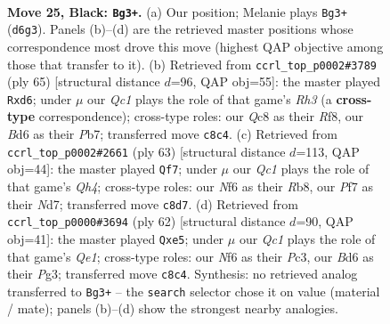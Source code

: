 \documentclass[11pt]{article}
\begin{document}
\clearpage

\begin{figure}[p]\centering
\begin{subfigure}{0.46\textwidth}\centering
\resizebox{\linewidth}{!}{%
\newchessgame
\chessboard[
  setfen={r1qk3r/p4pp1/3b1n1p/5P1P/B1Q4R/8/6p1/R1B1K1N1 b Q - 0 25},
  showmover=false,
  pgfstyle=straightmove, color=movearrow, markmove={d6-g3}
]}
\caption{}
\end{subfigure}\hfill
\begin{subfigure}{0.46\textwidth}\centering
\resizebox{\linewidth}{!}{%
\newchessgame
\chessboard[
  setfen={5r1k/1p6/p1nQ3r/2p2ppq/2P5/1P1P1BB1/P7/1R3RK1 b - - 0 33},
  showmover=false,
  pgfstyle=straightmove, color=movearrow, markmove={h6-d6}
]}
\caption{}
\end{subfigure}
\\[4pt]
\begin{subfigure}{0.46\textwidth}\centering
\resizebox{\linewidth}{!}{%
\newchessgame
\chessboard[
  setfen={1r4k1/3n2p1/1P1p1r2/2pP3q/P4pp1/8/3N1P2/2RR1BKQ b - - 1 32},
  showmover=false,
  pgfstyle=straightmove, color=movearrow, markmove={h5-f7}
]}
\caption{}
\end{subfigure}\hfill
\begin{subfigure}{0.46\textwidth}\centering
\resizebox{\linewidth}{!}{%
\newchessgame
\chessboard[
  setfen={1r4k1/1q6/6p1/ppb1r2p/3N4/P1P3PP/1P3K2/3RQ3 w - - 0 32},
  showmover=false,
  pgfstyle=straightmove, color=movearrow, markmove={e1-e5}
]}
\caption{}
\end{subfigure}
\caption{\textbf{Move 25, Black: \texttt{Bg3+}.} (a) Our position; Melanie plays \texttt{Bg3+} (\texttt{d6g3}). Panels (b)--(d) are the retrieved master positions whose correspondence most drove this move (highest QAP objective among those that transfer to it). (b) Retrieved from \texttt{ccrl\_top\_p0002\#3789} (ply 65) [structural distance $d$=96, QAP obj=55]: the master played \texttt{Rxd6}; under $\mu$ our \emph{Qc1} plays the role of that game's \emph{Rh3} (a \textbf{cross-type} correspondence); cross-type roles: our \emph{Q}c8 as their \emph{R}f8, our \emph{B}d6 as their \emph{P}b7; transferred move \texttt{c8c4}. (c) Retrieved from \texttt{ccrl\_top\_p0002\#2661} (ply 63) [structural distance $d$=113, QAP obj=44]: the master played \texttt{Qf7}; under $\mu$ our \emph{Qc1} plays the role of that game's \emph{Qh4}; cross-type roles: our \emph{N}f6 as their \emph{R}b8, our \emph{P}f7 as their \emph{N}d7; transferred move \texttt{c8d7}. (d) Retrieved from \texttt{ccrl\_top\_p0000\#3694} (ply 62) [structural distance $d$=90, QAP obj=41]: the master played \texttt{Qxe5}; under $\mu$ our \emph{Qc1} plays the role of that game's \emph{Qe1}; cross-type roles: our \emph{N}f6 as their \emph{P}c3, our \emph{B}d6 as their \emph{P}g3; transferred move \texttt{c8c4}. Synthesis: no retrieved analog transferred to \texttt{Bg3+} -- the \texttt{search} selector chose it on value (material / mate); panels (b)--(d) show the strongest nearby analogies.}
\label{fig:thought-m49}
\end{figure}
\end{document}
